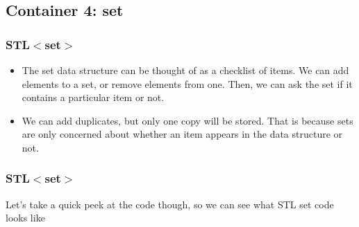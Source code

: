 \documentclass{beamer}
\newtheorem{Key points}{Key points}
\begin{document}
\subsection{Container 4: set}
\begin{frame}
  \frametitle{STL$<$set$>$}
  \begin{itemize}
  \item  The set data structure can be thought of as a checklist of items. We can
 add elements to a set, or remove elements from one. Then, we can ask the
 set if it contains a particular item or not.
\item  We can add duplicates, but only one copy will be stored.
 That is because sets are only concerned about whether an item appears in
 the data structure or not.
  \end{itemize}
\end{frame}
\begin{frame}
  \frametitle{STL$<$set$>$}
  \begin{center}
\Huge{ Let's take a quick peek at the code though,
so we can see what STL set code looks like
}    
  \end{center}

\end{frame}


\end{document}
